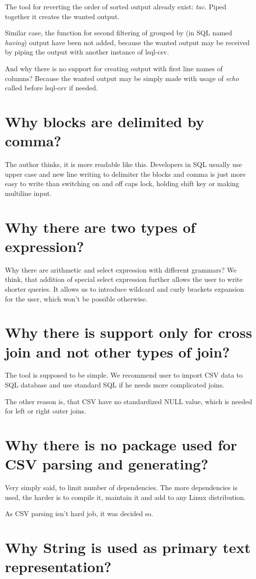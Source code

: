 The tool for reverting the order of sorted output already exist: \textit{tac}. Piped together it creates the wanted output.

Similar case, the function for second filtering of grouped by (in SQL named \textit{having}) 
output have been not added, because the wanted output
may be received by piping the output with another instance of lsql-csv.

And why there is no support for creating output with first line names of columns? Because the wanted output
may be simply made with usage of \textit{echo} called before lsql-csv if needed.

\section{Why blocks are delimited by comma?}
The author thinks, it is more readable like this. Developers in SQL usually use upper case and new line writing to delimiter the blocks and comma is just more easy to write than switching on and off caps lock, holding shift key or making multiline input.

\section{Why there are two types of expression?}
Why there are arithmetic and select expression with different grammars?
We think, that addition of special select expression further allows the user to write shorter queries.
It allows us to introduce wildcard and curly brackets expansion for the user, which won't be possible otherwise.

\section{Why there is support only for cross join and not other types of join?}
The tool is supposed to be simple. We recommend user to import CSV data to SQL database and use standard SQL if he needs more complicated joins.

The other reason is, that CSV have no standardized NULL value, which is needed for left or right outer joins.

\section{Why there is no package used for CSV parsing and generating?}
Very simply said, to limit number of dependencies. The more dependencies is used, the harder is to compile it, maintain it and add to any Linux distribution.

As CSV parsing isn't hard job, it was decided so.

\section{Why String is used as primary text representation?}
